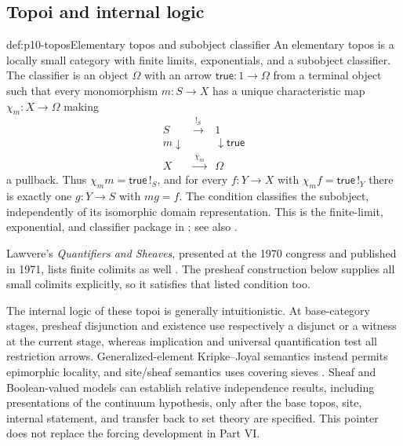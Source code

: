 \subsection{Topoi and internal logic}

\begin{hbdefinition}{def:p10-topos}{Elementary topos and subobject classifier}
An elementary topos is a locally small category with finite limits,
exponentials, and a subobject classifier.
The classifier is an object \(\Omega\) with an arrow
\(\mathsf{true}:1\to\Omega\) from a terminal object such that
every monomorphism \(m:S\to X\) has a unique characteristic map
\(\chi_m:X\to\Omega\) making
\[
\begin{array}{ccc}
 S&\xrightarrow{\ !_S\ }&1\\
 {\scriptstyle m}\downarrow&&\downarrow{\scriptstyle\mathsf{true}}\\
 X&\xrightarrow{\ \chi_m\ }&\Omega
\end{array}
\]
a pullback.
Thus \(\chi_m m=\mathsf{true}\,!_S\), and for every
\(f:Y\to X\) with \(\chi_m f=\mathsf{true}\,!_Y\) there is
exactly one \(g:Y\to S\) with \(m g=f\).
The condition classifies the subobject, independently of its
isomorphic domain representation.
This is the finite-limit, exponential, and classifier package in
\cite[Definition~1.2, p.~8]{MoerdijkVanOosten2007Topos};
see also \cite{MacLaneMoerdijk1992,Johnstone2002}.
\end{hbdefinition}

Lawvere's \emph{Quantifiers and Sheaves}, presented at the 1970
congress and published in 1971, lists finite colimits as well
\cite[p.~329]{Lawvere1970}.
The presheaf construction below supplies all small colimits
explicitly, so it satisfies that listed condition too.




The internal logic of these topoi is generally intuitionistic.
At base-category stages, presheaf disjunction and existence use
respectively a disjunct or a witness at the current stage, whereas
implication and universal quantification test all restriction arrows.
Generalized-element Kripke--Joyal semantics instead permits
epimorphic locality, and site/sheaf semantics uses covering sieves
\cite[\S1.2, p.~13; \S2.2, p.~32; \S3.3, pp.~58--59]
{MoerdijkVanOosten2007Topos}.
Sheaf and Boolean-valued
models can establish relative independence results, including presentations
of the continuum hypothesis, only after the base topos, site, internal
statement, and transfer back to set theory are specified. This pointer does not
replace the forcing development in Part VI.

